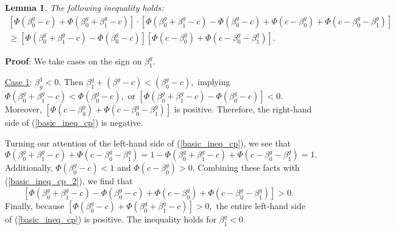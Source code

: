 \documentclass[12pt]{article}
\newtheorem{lemma}{Lemma}
\begin{document}
\begin{appendices}
\begin{refsection}
		\begin{lemma}
			The following inequality holds: 
			\begin{multline}\label{basic_ineq_cp}
			\left[\Phi(\beta^g_0 - c) + \Phi(\beta^g_0 + \beta^g_1 - c) \right] \cdot \left[\Phi(\beta_0^g + \beta_1^g - c) - \Phi(\beta_0^g - c) + \Phi(c - \beta^g_0) + \Phi(c - \beta_0^g - \beta_1^g) \right] \\ \geq \left[\Phi(\beta_0^g + \beta_1^g - c) - \Phi(\beta_0^g - c)\right]\left[\Phi(c - \beta^g_0) + \Phi(c - \beta_0^g - \beta_1^g)\right].
			\end{multline}
		\end{lemma}
		\textbf{Proof}: We take cases on the sign on $\beta^g_1$.
		
		\noindent
		\underline{Case 1}: $\beta^1_g < 0$. Then $ \beta^g_1 + (\beta^g - c) < (\beta^g_0 - c),$ implying $\Phi(\beta^g_0 + \beta^g_1 - c) < \Phi(\beta^g_0 - c),$ or $[\Phi(\beta^g_0 + \beta^g_1 - c) - \Phi(\beta^g_0 - c)] < 0.$ Moreover, $[\Phi(c - \beta^g_0) + \Phi(c - \beta_0^g - \beta_1^g)]$ is positive. Therefore, the right-hand side of (\ref{basic_ineq_cp}) is negative.
		
		Turning our attention of the left-hand side of (\ref{basic_ineq_cp}), we see that
		\begin{equation}\label{basic_ineq_cp_2}
		\Phi(\beta^g_0 + \beta^g_1 - c) + \Phi( c - \beta^g_0 - \beta^g_1) = 1 -\Phi(\beta^g_0 + \beta^g_1 - c) + \Phi( c - \beta^g_0 - \beta^g_1) = 1.
		\end{equation}
		Additionally, $\Phi(\beta^g_0 - c) < 1$ and $ \Phi(c - \beta^g_0) > 0$. Combining these facts with (\ref{basic_ineq_cp_2}), we find that
		$$ \left[\Phi(\beta_0^g + \beta_1^g - c) - \Phi(\beta_0^g - c) + \Phi(c - \beta^g_0) + \Phi(c - \beta_0^g - \beta_1^g) \right] > 0. $$ Finally, because $\left[\Phi(\beta^g_0 - c) + \Phi(\beta^g_0 + \beta^g_1 - c) \right] > 0,$ the entire left-hand side of (\ref{basic_ineq_cp}) is positive. The inequality holds for $\beta^g_1 < 0$.
		

\end{refsection}
\end{appendices}
\end{document}
